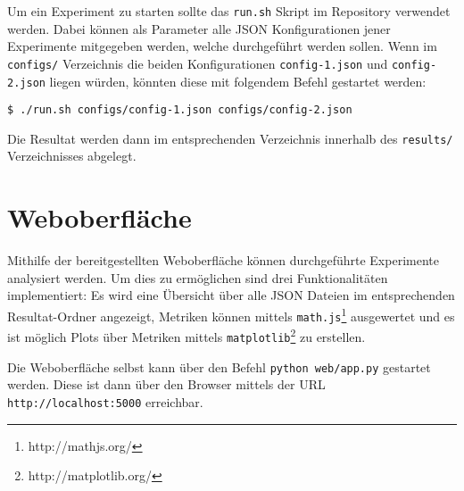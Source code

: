 \begin{appendices}
Um ein Experiment zu starten sollte das \texttt{run.sh} Skript im Repository verwendet werden. Dabei können als Parameter alle JSON Konfigurationen jener Experimente mitgegeben werden, welche durchgeführt werden sollen. Wenn im \texttt{configs/} Verzeichnis die beiden Konfigurationen \texttt{config-1.json} und \texttt{config-2.json} liegen würden, könnten diese mit folgendem Befehl gestartet werden:

\begin{lstlisting}[frame=none]
$ ./run.sh configs/config-1.json configs/config-2.json
\end{lstlisting}

Die Resultat werden dann im entsprechenden Verzeichnis innerhalb des \texttt{results/} Verzeichnisses abgelegt.

\section{Weboberfläche}
Mithilfe der bereitgestellten Weboberfläche können durchgeführte Experimente analysiert werden. Um dies zu ermöglichen sind drei Funktionalitäten implementiert: Es wird eine Übersicht über alle JSON Dateien im entsprechenden Resultat-Ordner angezeigt, Metriken können mittels \texttt{math.js}\footnote{http://mathjs.org/} ausgewertet und es ist möglich Plots über Metriken mittels \texttt{matplotlib}\footnote{http://matplotlib.org/} zu erstellen.

Die Weboberfläche selbst kann über den Befehl \texttt{python web/app.py} gestartet werden. Diese ist dann über den Browser mittels der URL \texttt{http://localhost:5000} erreichbar.

\end{appendices}